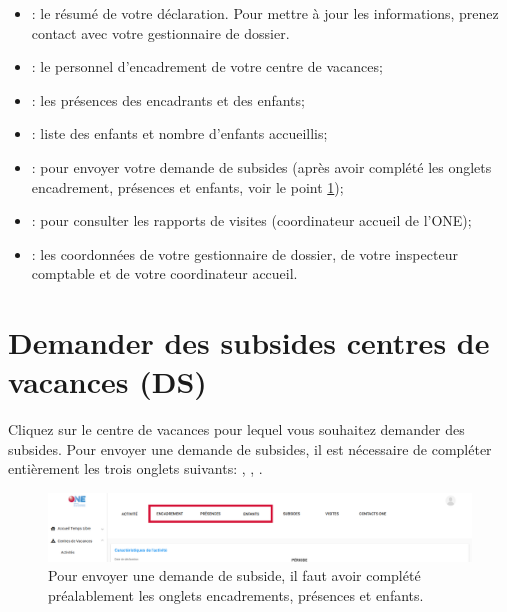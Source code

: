 \begin{itemize}[label=\textbullet,font=\color{bleu}]
    \item {}: le résumé de votre déclaration. Pour mettre à jour les informations, prenez contact avec votre gestionnaire de dossier. 
    \item {}: le personnel d'encadrement de votre centre de vacances;
    \item {}: les présences des encadrants et des enfants;
    \item {}: liste des enfants et nombre d'enfants accueillis; 
    \item {}: pour envoyer votre demande de subsides (après avoir complété les onglets encadrement, présences et enfants, voir le point \ref{DS_CDV});
    \item {}: pour consulter les rapports de visites (coordinateur accueil de l'ONE);
    \item {}: les coordonnées de votre gestionnaire de dossier, de votre inspecteur comptable et de votre coordinateur accueil. 
\end{itemize}




\section{Demander des subsides centres de vacances (DS)}\label{DS_CDV}
Cliquez sur le centre de vacances pour lequel vous souhaitez demander des subsides. 
Pour envoyer une demande de subsides, il est nécessaire de compléter entièrement les trois onglets suivants: , , .


\begin{figure}[h!]
    \centering
    \includegraphics[width=16cm]{Images/cdv/cdv-onglets-ds.png}
    \caption{Pour envoyer une demande de subside, il faut avoir complété préalablement les onglets encadrements, présences et enfants.}
    \label{fig:cdv_onglets}
\end{figure}



